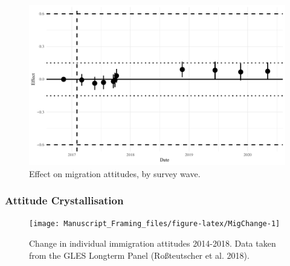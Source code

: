 \documentclass[
  12pt,
]{article}
\begin{document}
\begin{figure}[!ht]

{\centering \includegraphics{Manuscript_Framing_files/figure-latex/migwaves-1} 

}

\caption{Effect on migration attitudes, by survey wave.}\label{fig:migwaves}
\end{figure}

\hypertarget{attitude-crystallisation}{%
\subsubsection{Attitude Crystallisation}\label{attitude-crystallisation}}

\begin{figure}[!ht]

{\centering \texttt{[image: Manuscript\_Framing\_files/figure-latex/MigChange-1]} 

}

\caption{Change in individual immigration attitudes 2014-2018. Data taken from the GLES Longterm Panel (Roßteutscher et al. 2018).}\label{fig:MigChange}
\end{figure}
\end{document}
